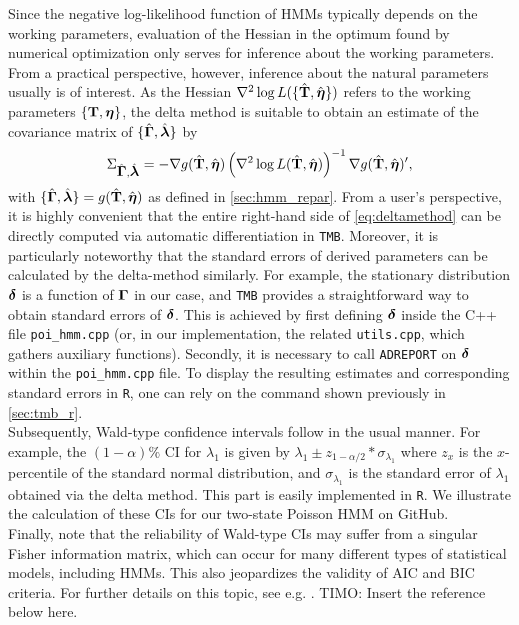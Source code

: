 \documentclass[bimj,fleqn]{w-art}\usepackage[]{graphicx}\usepackage[]{color}
\newcommand{\bct}{{\bf T}}
\newcommand{\bgamma}{\mbox{\boldmath $\Gamma$}}
\newcommand{\bfeta}{\mbox{\boldmath $\eta$}}
\newcommand{\bfdelta}{\mbox{\boldmath $\delta$}}
\newcommand{\bflambda}{\mbox{\boldmath $\lambda$}}
\theoremstyle{plain}
\theoremstyle{definition}
\begin{document}
Since the negative log-likelihood function of HMMs typically depends on the working parameters, evaluation of the Hessian in the optimum found by numerical optimization only serves for inference about the working parameters. From a practical perspective, however, inference about the natural parameters usually is of interest. As the Hessian $\nabla^2\log L(\{\hat{\bct}, \hat{\bfeta}\})$ refers to the working parameters $\{\bct, \bfeta\}$, the delta method is suitable to obtain an estimate of the covariance matrix of $\{\hat{\bgamma}, \hat{\bflambda}\}$ by
\begin{equation}
\Sigma_{\hat{\bgamma}, \hat{\bflambda}} = - \nabla g(\hat{\bct}, \hat{\bfeta})\left(\nabla^2\log L(\hat{\bct}, \hat{\bfeta})\right)^{-1}\nabla g(\hat{\bct}, \hat{\bfeta})^\prime,
\label{eq:deltamethod}
\end{equation}
with $\{\hat{\bgamma}, \hat{\bflambda}\} = g(\hat{\bct}, \hat{\bfeta})$ as defined in \autoref{sec:hmm_repar}.
From a user's perspective, it is highly convenient that the entire right-hand side of \autoref{eq:deltamethod} can be directly computed via automatic differentiation in \texttt{TMB}. Moreover, it is particularly noteworthy that the standard errors of derived parameters can be calculated by the delta-method similarly. For example, the stationary distribution $\bfdelta$ is a function of $\bgamma$ in our case, and \texttt{TMB} provides a straightforward way to obtain standard errors of $\bfdelta$. This is achieved by first defining $\bfdelta$ inside the C++ file  \texttt{poi\_hmm.cpp} (or, in our implementation, the related \texttt{utils.cpp}, which gathers auxiliary functions). Secondly, it is necessary to call \texttt{ADREPORT} on $\bfdelta$ within the \texttt{poi\_hmm.cpp} file. To display the resulting estimates and corresponding standard errors in \texttt{R}, one can rely on the command shown previously in \autoref{sec:tmb_r}.\\
Subsequently, Wald-type confidence intervals \citep{wald} follow in the usual manner. For example, the $(1 - \alpha) \%$ CI for $\lambda_1$ is given by $\lambda_1 \pm z_{1-\alpha/2} * \sigma_{\lambda_1}$ where $z_{x}$ is the $x$-percentile of the standard normal distribution, and $\sigma_{\lambda_1}$ is the standard error of $\lambda_1$ obtained via the delta method. This part is easily implemented in \texttt{R}. We illustrate the calculation of these CIs for our two-state Poisson HMM on GitHub.\\

Finally, note that the reliability of Wald-type CIs may suffer from a singular Fisher information matrix, which can occur for many different types of statistical models, including HMMs. This also jeopardizes the validity of AIC and BIC criteria. For further details on this topic, see e.g. \citet{drton}. TIMO: Insert the reference below here.\\
\end{document}
